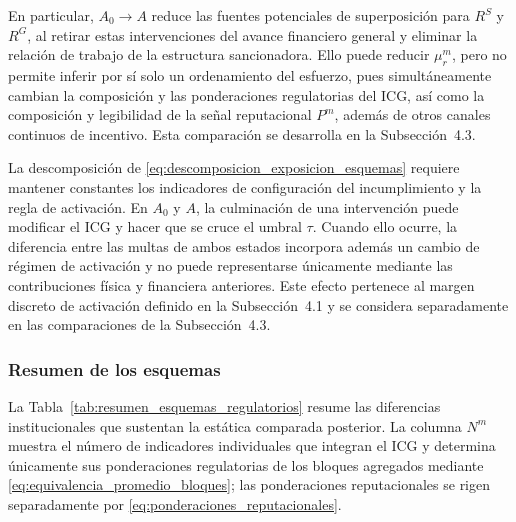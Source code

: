 En particular, \(A_0\to A\) reduce las fuentes potenciales de superposición para \(R^{S}\) y \(R^{G}\), al retirar estas intervenciones del avance financiero general y eliminar la relación de trabajo de la estructura sancionadora. Ello puede reducir \(\mu_r^m\), pero no permite inferir por sí solo un ordenamiento del esfuerzo, pues simultáneamente cambian la composición y las ponderaciones regulatorias del ICG, así como la composición y legibilidad de la señal reputacional \(P^m\), además de otros canales continuos de incentivo. Esta comparación se desarrolla en la Subsección~4.3.

La descomposición de \eqref{eq:descomposicion_exposicion_esquemas} requiere mantener constantes los indicadores de configuración del incumplimiento y la regla de activación. En \(A_0\) y \(A\), la culminación de una intervención puede modificar el ICG y hacer que se cruce el umbral \(\tau\). Cuando ello ocurre, la diferencia entre las multas de ambos estados incorpora además un cambio de régimen de activación y no puede representarse únicamente mediante las contribuciones física y financiera anteriores. Este efecto pertenece al margen discreto de activación definido en la Subsección~4.1 y se considera separadamente en las comparaciones de la Subsección~4.3.

\subsubsection{Resumen de los esquemas}

La Tabla~\ref{tab:resumen_esquemas_regulatorios} resume las diferencias institucionales que sustentan la estática comparada posterior. La columna \(N^m\) muestra el número de indicadores individuales que integran el ICG y determina únicamente sus ponderaciones regulatorias de los bloques agregados mediante \eqref{eq:equivalencia_promedio_bloques}; las ponderaciones reputacionales se rigen separadamente por \eqref{eq:ponderaciones_reputacionales}.

